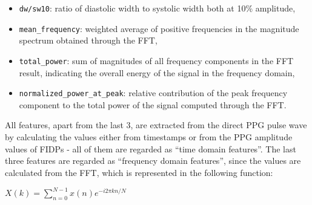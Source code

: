 \begin{itemize}
    \item \texttt{dw/sw10}: ratio of diastolic width to systolic width both at 10\% amplitude,
    \item \texttt{mean\_frequency}: weighted average of positive frequencies in the magnitude spectrum obtained through the FFT,
    \item \texttt{total\_power}: sum of magnitudes of all frequency components in the FFT result, indicating the overall energy of the signal in the frequency domain,
    \item \texttt{normalized\_power\_at\_peak}: relative contribution of the peak frequency component to the total power of the signal computed through the FFT\@.
\end{itemize}

\newpage
All features, apart from the last 3, are extracted from the direct PPG pulse wave by calculating the values either from timestamps or from the PPG amplitude values of FIDPs
- all of them are regarded as \enquote{time domain features}.
The last three features are regarded as \enquote{frequency domain features}, since the values are calculated from the FFT, which is represented in the following function:

\begin{center}
    \large
    \begin{math}
        X(k) = \sum_{n=0}^{N-1} x(n) e^{-i 2\pi kn/N}
    \end{math}
\end{center}

